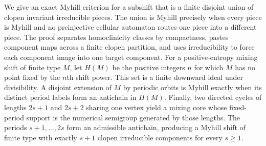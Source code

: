 We give an exact Myhill criterion for a subshift that is a finite disjoint
union of clopen invariant irreducible pieces.  The union is Myhill precisely
when every piece is Myhill and no preinjective cellular automaton routes one
piece into a different piece.  The proof separates homoclinicity classes by
compactness, pastes component maps across a finite clopen partition, and uses
irreducibility to force each component image into one target component.  For a
positive-entropy mixing shift of finite type $M$, let $H(M)$ be the positive
integers $n$ for which $M$ has no point fixed by the $n$th shift power.  This
set is a finite downward ideal under divisibility.  A disjoint extension of
$M$ by periodic orbits is Myhill exactly when its distinct period labels form
an antichain in $H(M)$.  Finally, two directed cycles of lengths $2s+1$ and
$2s+2$ sharing one vertex yield a mixing core whose fixed-period support is
the numerical semigroup generated by those lengths.  The periods
$s+1,\ldots,2s$ form an admissible antichain, producing a Myhill shift of
finite type with exactly $s+1$ clopen irreducible components for every
$s\geq 1$.

